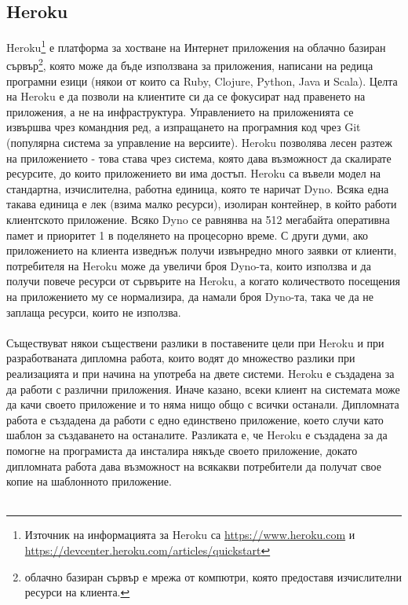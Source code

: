 \documentclass[pdftex,14pt,a4paper]{extreport}
\begin{document}
\subsection {Heroku}
Heroku\footnote{Източник на информацията за Heroku са \url{https://www.heroku.com} и \\\url{https://devcenter.heroku.com/articles/quickstart}} е платформа за хостване на Интернет приложения на облачно базиран сървър\footnote{облачно базиран сървър е мрежа от компютри, която предоставя изчислителни ресурси на клиента.}, която може да бъде използвана за приложения, написани на редица програмни езици (някои от които са Ruby, Clojure, Python, Java и Scala). Целта на Heroku е да позволи на клиентите си да се фокусират над правенето на приложения, а не на инфраструктура. Управлението на приложенията се извършва чрез командния ред, а изпращането на програмния код чрез Git (популярна система за управление на версиите). Heroku позволява лесен разтеж на приложението - това става чрез система, която дава възможност да скалирате ресурсите, до които приложението ви има достъп. Heroku са въвели модел на стандартна, изчислителна, работна единица, която те наричат Dyno. Всяка една такава единица е лек (взима малко ресурси), изолиран контейнер, в който работи клиентското приложение. Всяко Dyno се равнянва на 512 мегабайта оперативна памет и приоритет 1 в поделянето на процесорно време. С други думи, ако приложението на клиента изведнъж получи извънредно много заявки от клиенти, потребителя на Heroku може да увеличи броя Dyno-та, които използва и да получи повече ресурси от сървърите на Heroku, а когато количеството посещения на приложението му се нормализира, да намали броя Dyno-та, така че да не заплаща ресурси, които не използва.\\\\
Съществуват някои съществени разлики в поставените цели при Heroku и при разработваната дипломна работа, които водят до множество разлики при реализацията и при начина на употреба на двете системи. Heroku е създадена за да работи с различни приложения. Иначе казано, всеки клиент на системата може да качи своето приложение и то няма нищо общо с всички останали. Дипломната работа е създадена да работи с едно единствено приложение, което случи като шаблон за създаването на останалите. Разликата е, че Heroku е създадена за да помогне на програмиста да инсталира някъде своето приложение, докато дипломната работа дава възможност на всякакви потребители да получат свое копие на шаблонното приложение.\\\\
\end{document}
